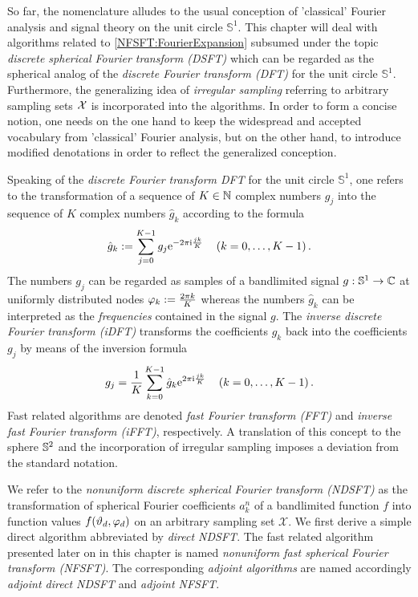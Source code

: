 So far, the nomenclature alludes to the 
usual conception of 'classical' Fourier analysis and signal theory on the 
unit circle $\mathbb{S}^1$. This chapter will deal with algorithms related 
to \eqref{NFSFT:FourierExpansion} subsumed under the topic \emph{discrete 
spherical Fourier transform (DSFT)} which can be regarded as the spherical 
analog of the \emph{discrete Fourier transform (DFT)} for the unit circle 
$\mathbb{S}^1$. Furthermore, the generalizing idea of \emph{irregular sampling} 
referring to arbitrary sampling sets $\mathbf{\mathcal{X}}$ is incorporated into 
the algorithms. In order to form a concise notion, one needs on the one hand 
to keep the widespread and accepted vocabulary from 'classical' Fourier 
analysis, but on the other hand, to introduce modified denotations in order 
to reflect the generalized conception.

Speaking of the \emph{discrete Fourier transform DFT} for the unit 
circle $\mathbb{S}^1$, one refers to the transformation of a sequence of $K \in \mathbb{N}$ 
complex numbers $g_{j}$ into the sequence of $K$ 
complex numbers $\hat{g}_{k}$ according to the formula
\begin{equation}
  \label{NFSFT:DDFT}
  \hat{g}_{k} := \sum_{j=0}^{K-1} g_{j} \mbox{\rm{e}}^{-2\pi\mbox{\scriptsize\rm{i}} \frac{jk}{K}} \quad \left(k=0,\ldots,K-1\right).
\end{equation}
The numbers $g_{j}$ can be regarded as samples of a bandlimited 
signal $g: \mathbb{S}^1 \rightarrow \mathbb{C}$ at uniformly distributed nodes 
$\varphi_{k} := \frac{2\pi k}{K}$ whereas the numbers $\hat{g}_{k}$
can be interpreted as the \emph{frequencies} contained in the signal $g$.
The \emph{inverse discrete Fourier transform (iDFT)} transforms the coefficients $\hat{g}_{k}$ 
back into the coefficients $g_{j}$ by means of the inversion formula
\begin{equation}
  \label{NFSFT:DFTInv}
  g_{j} = \frac{1}{K} \sum_{k=0}^{K-1} \hat{g}_{k} \mbox{\rm{e}}^{2\pi\mbox{\scriptsize\rm{i}} \frac{jk}{K}} \quad \left(k=0,\ldots,K-1\right).
\end{equation}
Fast related algorithms are denoted \emph{fast Fourier transform (FFT)} and 
\emph{inverse fast Fourier transform (iFFT)}, respectively.
A translation of this concept to the sphere $\mathbb{S}^2$ and the incorporation 
of irregular sampling imposes a deviation from the standard notation. 

We refer to the 
\emph{nonuniform discrete spherical Fourier transform (NDSFT)} as the 
transformation of spherical Fourier coefficients 
$a_{k}^n$ of a bandlimited function $f$ into function values 
$f{\hspace{-0.4ex}}\left(\vartheta_{d},\varphi_{d}\right)$ on an arbitrary sampling 
set $\mathcal{X}$. We first derive a simple direct algorithm abbreviated 
by \emph{direct NDSFT}. The fast related algorithm presented later on in this chapter is 
named \emph{nonuniform fast spherical 
Fourier transform (NFSFT)}. The corresponding \emph{adjoint algorithms} are
named accordingly \emph{adjoint direct NDSFT} and \emph{adjoint NFSFT}.

